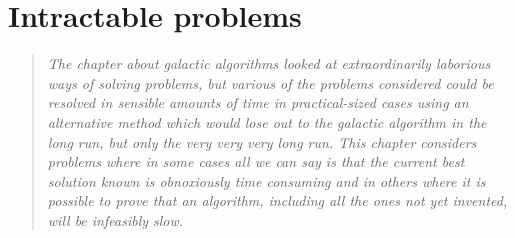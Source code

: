 \section{Intractable problems}
\begin{quotation}\textit{
The chapter about galactic algorithms looked at extraordinarily
laborious ways of solving problems, but various of the problems
considered could be resolved in sensible amounts of time in practical-sized
cases using an alternative method which would lose out to the galactic
algorithm in the long run, but only the very very very long run. This
chapter considers problems where in some cases all we can say is that the
current best solution known is obnoxiously time consuming and in others
where it is possible to prove that an algorithm, including all the ones
not yet invented, will be infeasibly slow.
}\end{quotation}


